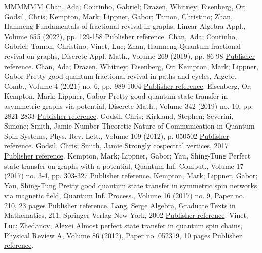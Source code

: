\documentclass[11pt]{article}
\theoremstyle{definition}
\numberwithin{equation}{section}
\newcommand\+{\mkern2mu}
\newcommand{\1}{\mathbf 1}
\begin{document}
\begin{thebibliography}{MMMMMM}
 Chan, Ada; Coutinho, Gabriel; Drazen, Whitney; Eisenberg, Or; Godsil, Chris; Kempton, Mark; Lippner, Gabor; Tamon, Christino; Zhan, Hanmeng Fundamentals of fractional revival in graphs, Linear Algebra Appl., Volume 655 (2022), pp. 129-158 \href{https://alco.centre-mersenne.org/articles/10.5802/alco.379/#chan2020fundamentals}{Publisher reference}.
 Chan, Ada; Coutinho, Gabriel; Tamon, Christino; Vinet, Luc; Zhan, Hanmeng Quantum fractional revival on graphs, Discrete Appl. Math., Volume 269 (2019), pp. 86-98 \href{https://alco.centre-mersenne.org/articles/10.5802/alco.379/#ChanCoutinhoTamonVinetZhan}{Publisher reference}.
 Chan, Ada; Drazen, Whitney; Eisenberg, Or; Kempton, Mark; Lippner, Gabor Pretty good quantum fractional revival in paths and cycles, Algebr. Comb., Volume 4 (2021) no. 6, pp. 989-1004 \href{https://alco.centre-mersenne.org/articles/10.5802/alco.379/#chan2020approximate}{Publisher reference}.
 Eisenberg, Or; Kempton, Mark; Lippner, Gabor Pretty good quantum state transfer in asymmetric graphs via potential, Discrete Math., Volume 342 (2019) no. 10, pp. 2821-2833 \href{https://alco.centre-mersenne.org/articles/10.5802/alco.379/#eisenberg2019pretty}{Publisher reference}.
 Godsil, Chris; Kirkland, Stephen; Severini, Simone; Smith, Jamie Number-Theoretic Nature of Communication in Quantum Spin Systems, Phys. Rev. Lett., Volume 109 (2012), p. 050502 \href{https://alco.centre-mersenne.org/articles/10.5802/alco.379/#Godsil2012}{Publisher reference}.
 Godsil, Chris; Smith, Jamie Strongly cospectral vertices, 2017 \href{https://alco.centre-mersenne.org/articles/10.5802/alco.379/#godsil_smith_2017}{Publisher reference}.
 Kempton, Mark; Lippner, Gabor; Yau, Shing-Tung Perfect state transfer on graphs with a potential, Quantum Inf. Comput., Volume 17 (2017) no. 3-4, pp. 303-327 \href{https://alco.centre-mersenne.org/articles/10.5802/alco.379/#us}{Publisher reference}.
 Kempton, Mark; Lippner, Gabor; Yau, Shing-Tung Pretty good quantum state transfer in symmetric spin networks via magnetic field, Quantum Inf. Process., Volume 16 (2017) no. 9, Paper no. 210, 23 pages \href{https://alco.centre-mersenne.org/articles/10.5802/alco.379/#invol}{Publisher reference}.
 Lang, Serge Algebra, Graduate Texts in Mathematics, 211, Springer-Verlag New York, 2002 \href{https://alco.centre-mersenne.org/articles/10.5802/alco.379/#lang_book}{Publisher reference}.
 Vinet, Luc; Zhedanov, Alexei Almost perfect state transfer in quantum spin chains, Physical Review A, Volume 86 (2012), Paper no. 052319, 10 pages \href{https://alco.centre-mersenne.org/articles/10.5802/alco.379/#Vinet2012}{Publisher reference}.
\end{thebibliography}
\end{document}
